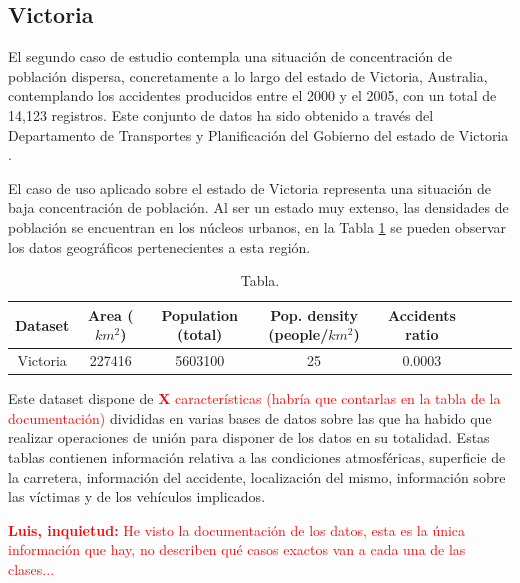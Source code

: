 \documentclass{uathesis-es}
\begin{document}
{	
	\subsection*{Victoria}
	
	
	El segundo caso de estudio contempla una situación de concentración de población dispersa, concretamente a lo largo del estado de Victoria, Australia, contemplando los accidentes producidos entre el 2000 y el 2005, con un total de 14,123 registros. Este conjunto de datos ha sido obtenido a través del Departamento de Transportes y Planificación del Gobierno del estado de Victoria \cite{InfoDatasetVictoria}.
	
	El caso de uso aplicado sobre el estado de Victoria representa una situación de baja concentración de población. Al ser un estado muy extenso, las densidades de población se encuentran en los núcleos urbanos, en la Tabla \ref{Victoria_statistics} se pueden observar los datos geográficos pertenecientes a esta región.
	
	\begin{table}[H]
		\begin{center}
			\begin{tabular}{|c|c||c|c|c|c|c|c|}
				\hline
				
				\textbf{Dataset} & \textbf{Area ($km^2$)} & \textbf{Population (total)} & \textbf{Pop. density (people/$km^2$)} & \textbf{Accidents ratio}
				\\ \hline \hline
				
				Victoria & 227416 &  5603100  & 25  & 0.0003\\ \hline
				
			\end{tabular}
		\end{center}
		\caption{Tabla.}
		\label{Victoria_statistics}
	\end{table}
	
	Este dataset dispone de  \textcolor{red}{\textbf{X} características (habría que contarlas en la tabla de la documentación)} divididas en varias bases de datos sobre las que ha habido que realizar operaciones de unión para disponer de los datos en su totalidad. Estas tablas contienen información relativa a las condiciones atmosféricas, superficie de la carretera, información del accidente, localización del mismo, información sobre las víctimas y de los vehículos implicados.
	
	
	
	\textcolor{red}{\textbf{Luis, inquietud:} He visto la documentación de los datos, esta es la única información que hay, no describen qué casos exactos van a cada una de las clases...}
	
}
\end{document}
